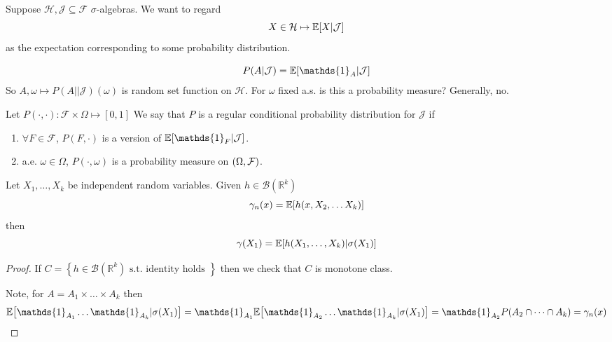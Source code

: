 Suppose $\mathcal{H}, \mathcal{J} \subseteq \mathcal{F}$ $\sigma$-algebras. We want to regard 
$$X\in \mathcal{H}\mapsto \mathbb{E}\qty[X|\mathcal{J}]$$
as the expectation corresponding to some probability distribution.

$$P(A|\mathcal{J}) = \mathbb{E}\qty[\mathds{1}_A|\mathcal{J}]$$
So $A,\omega \mapsto P(A||\mathcal{J})(\omega)$ is random set function on $\mathcal{H}$. For $\omega$ fixed a.s. is this a probability measure? Generally, no.


\begin{definition}
Let $P(\cdot, \cdot): \mathcal{F}\times \Omega \mapsto [0,1]$
We say that $P$ is a regular conditional probability distribution for $\mathcal{J}$ if
\begin{enumerate}
	\item $\forall F\in \mathcal{F} $, $P(F, \cdot)$ is a version of $\mathbb{E}\qty[\mathds{1}_F|\mathcal{J}]$.
	\item a.e. $\omega\in \Omega $, $P(\cdot, \omega)$ is a probability measure on $\qty(\Omega, \mathcal{F})$.
\end{enumerate}
\end{definition}

\begin{prop}
	
	Let $X_1,\dots, X_k$ be independent random variables. Given $h \in \mathcal{B}(\mathbb{R}^k)$
	$$\gamma_n(x) = \mathbb{E} \qty[h(x,X_2, \dots X_k)]$$
	then
	$$\gamma(X_1) = \mathbb{E} \qty[h(X_1, \dots, X_k) | \sigma(X_1)]$$
	
	\begin{proof}
		If $C = \left\{ h\in \mathcal{B}(\mathbb{R}^k) \text{ s.t. identity holds } \right\}$ then we check that $C$ is monotone class.
		
		Note, for $A = A_1 \times \dots \times A_k$ then
		$$\mathbb{E} \qty[\mathds{1}_{A_1}\dots\mathds{1}_{A_k} | \sigma(X_1)] = \mathds{1}_{A_1} \mathbb{E} \qty[\mathds{1}_{A_2}\dots\mathds{1}_{A_k} | \sigma(X_1)] = \mathds{1}_{A_2} P(A_2\cap \dots \cap A_k) = \gamma_n(x)$$
	\end{proof}
\end{prop}